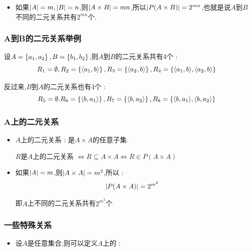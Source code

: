 {{{\begin{itemize}
{          $R$是$A$到$B$的二元关系$\Leftrightarrow R \subseteq A \times B \Leftrightarrow R \in P(A \times B)$
          }
    \item 如果$\left\lvert A \right\vert = m,\left\lvert B \right\vert = n$,则$\left\lvert A \times B \right\vert = mn$,所以$\left\lvert P(A \times B) \right\vert = 2^{mn}$,也就是说$A$到$B$不同的二元关系共有$2^{mn}$个.
  \end{itemize}
}%

\subsubsection{A到B的二元关系举例}{
  设$A = \left\{ a_1,a_2 \right\},B = \left\{ b_1,b_2 \right\}$,则$A$到$B$的二元关系共有4个 : $$
    R_1 = \emptyset,R_2 = \left\{ \langle a_1,b\rangle \right\},R_3 = \left\{ \langle a_2,b\rangle \right\},R_4 = \left\{ \langle a_1,b\rangle,\langle a_2,b\rangle \right\}
  $$

  反过来,$B$到$A$的二元关系也有4个 : $$
    R_5 = \emptyset.R_6 = \left\{ \langle b,a_1\rangle \right\},R_7 = \left\{ \langle b,a_2\rangle \right\},R_8 = \left\{ \langle b,a_1\rangle,\langle b,a_2\rangle \right\}
  $$
}%

\subsubsection{A上的二元关系}{
  \begin{itemize}
    \item {
          $A$上的二元关系 : 是$A \times A$的任意子集.

          $R$是$A$上的二元关系 $\Leftrightarrow R \subseteq A \times A \Leftrightarrow R \in P(A \times A)$
          }
    \item {
          如果$\left\lvert A \right\vert = m$,则$\left\lvert A \times A \right\vert = m^2$,所以 : $$
            \left\lvert P(A \times A) \right\vert = 2^{m^2}
          $$

          即$A$上不同的二元关系共有$2^{m^2}$个
          }
  \end{itemize}
}%

\subsubsection{一些特殊关系}{
  \begin{itemize}
    \item {
          设$A$是任意集合,则可以定义$A$上的 :

}
\end{itemize}}}}
